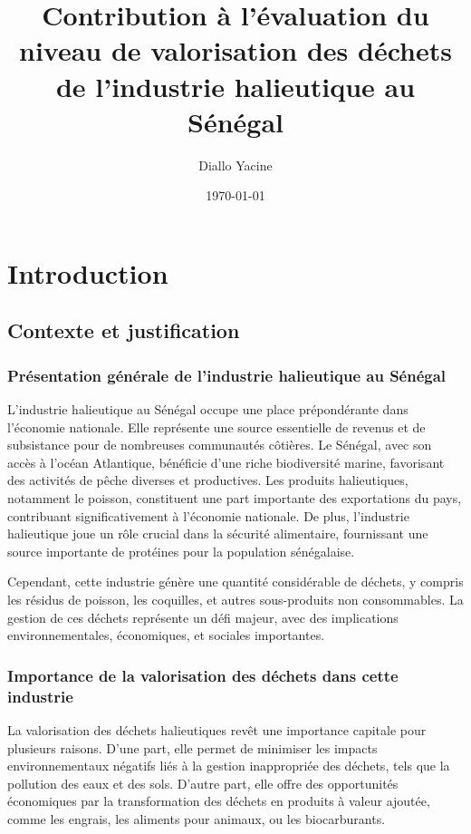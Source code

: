 \documentclass[12pt,a4paper]{report}
\begin{document}
\title{Contribution à l'évaluation du niveau de valorisation des déchets de l'industrie halieutique au Sénégal}
\author{Diallo Yacine}
\date{\today}
\maketitle

\tableofcontents

\chapter*{Introduction}
\section*{Contexte et justification}

\subsection*{Présentation générale de l'industrie halieutique au Sénégal}
L'industrie halieutique au Sénégal occupe une place prépondérante dans l'économie nationale. Elle représente une source essentielle de revenus et de subsistance pour de nombreuses communautés côtières. Le Sénégal, avec son accès à l'océan Atlantique, bénéficie d'une riche biodiversité marine, favorisant des activités de pêche diverses et productives. Les produits halieutiques, notamment le poisson, constituent une part importante des exportations du pays, contribuant significativement à l'économie nationale. De plus, l'industrie halieutique joue un rôle crucial dans la sécurité alimentaire, fournissant une source importante de protéines pour la population sénégalaise.

Cependant, cette industrie génère une quantité considérable de déchets, y compris les résidus de poisson, les coquilles, et autres sous-produits non consommables. La gestion de ces déchets représente un défi majeur, avec des implications environnementales, économiques, et sociales importantes. 

\subsection*{Importance de la valorisation des déchets dans cette industrie}
La valorisation des déchets halieutiques revêt une importance capitale pour plusieurs raisons. D'une part, elle permet de minimiser les impacts environnementaux négatifs liés à la gestion inappropriée des déchets, tels que la pollution des eaux et des sols. D'autre part, elle offre des opportunités économiques par la transformation des déchets en produits à valeur ajoutée, comme les engrais, les aliments pour animaux, ou les biocarburants. 
\end{document}
